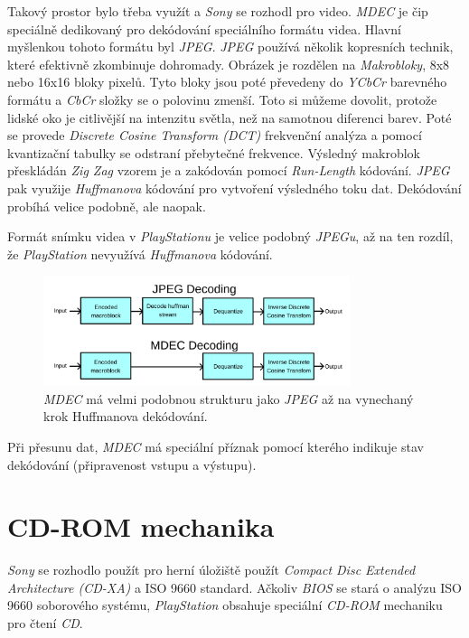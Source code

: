 Takový prostor bylo třeba využít a \textit{Sony} se rozhodl pro video. \textit{MDEC} je čip speciálně dedikovaný
pro dekódování speciálního formátu videa. Hlavní myšlenkou tohoto formátu byl \textit{JPEG}. \textit{JPEG} používá
několik kopresních technik, které efektivně zkombinuje dohromady. Obrázek je rozdělen na \textit{Makrobloky}, 8x8 nebo 16x16
bloky pixelů. Tyto bloky jsou poté převedeny do \textit{YCbCr} barevného formátu a \textit{CbCr} složky se o polovinu
zmenší. Toto si můžeme dovolit, protože lidské oko je citlivější na intenzitu světla, než na samotnou diferenci barev.
Poté se provede \textit{Discrete Cosine Transform (DCT)} frekvenční analýza a pomocí kvantizační tabulky se odstraní přebytečné frekvence. 
Výsledný makroblok přeskládán \textit{Zig Zag} vzorem je a zakódován pomocí \textit{Run-Length} kódování.
\textit{JPEG} pak využije \textit{Huffmanova} kódování pro vytvoření výsledného toku dat.
Dekódování probíhá velice podobně, ale naopak. 

Formát snímku videa v \textit{PlayStationu} je velice podobný \textit{JPEGu}, až
na ten rozdíl, že \textit{PlayStation} nevyužívá \textit{Huffmanova} kódování.

\begin{figure}[hbt]
	\centering
	\includegraphics[width=0.8\textwidth]{obrazky-figures/mdec-decoding.png}
	\caption{\textit{MDEC} má velmi podobnou strukturu jako \textit{JPEG} až na vynechaný krok Huffmanova dekódování.}
	\label{mdec-decoding}
\end{figure}

Při přesunu dat, \textit{MDEC} má speciální příznak pomocí kterého indikuje stav dekódování (připravenost vstupu a výstupu).

\section{CD-ROM mechanika}

\textit{Sony} se rozhodlo použít pro herní úložiště použít \textit{Compact Disc Extended Architecture (CD-XA)} a ISO 9660 standard.
Ačkoliv \textit{BIOS} se stará o analýzu ISO 9660 soborového systému, \textit{PlayStation} obsahuje speciální \textit{CD-ROM} mechaniku
pro čtení \textit{CD}. 

